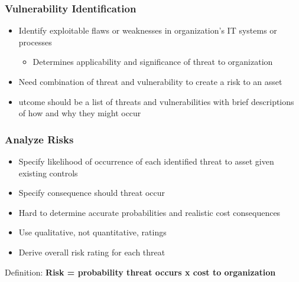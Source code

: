 \documentclass[xcolor ={table,usenames,dvipsnames}]{beamer}
\theoremstyle{definition}
\begin{document}
	\begin{frame}
		\frametitle{Vulnerability Identification}
		\begin{itemize}
			\item Identify exploitable flaws or weaknesses in organization’s IT systems or processes
			\begin{itemize}
				\item Determines applicability and significance of threat to organization
			\end{itemize}
			\item Need combination of threat and vulnerability to create a risk to an asset
			\item utcome should be a list of threats and vulnerabilities with brief descriptions of how and why they might occur
		\end{itemize}
	\end{frame}

	\begin{frame}
		\frametitle{Analyze Risks}
		\begin{itemize}
			\item Specify likelihood of occurrence of each identified threat to asset given existing controls
			\item Specify consequence should threat occur
			\item Hard to determine accurate               probabilities and realistic cost          consequences
			\item Use qualitative, not quantitative, ratings 
			\item Derive overall risk rating for each threat
		\end{itemize}
		\begin{alertblock}{Definition:}
			\textbf{Risk = probability threat occurs x cost to organization}
		\end{alertblock}
	\end{frame}

	





	

	
\end{document}
